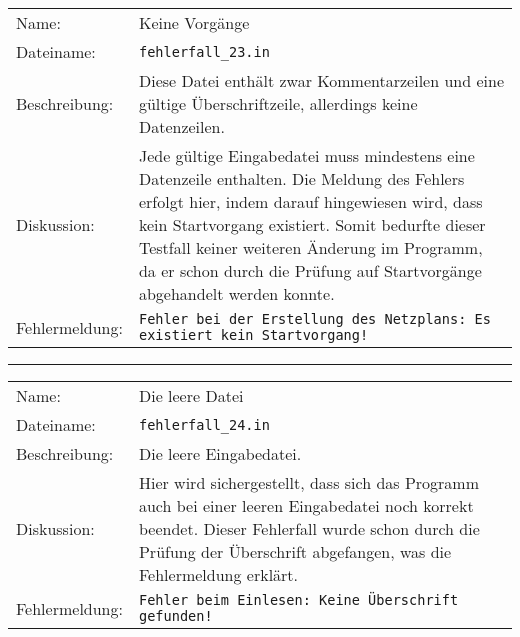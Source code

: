 \begin{tabularx}{\textwidth}{l X}
  Name: & Keine Vorg\"ange \\
  Dateiname: & \texttt{fehlerfall\_23.in} \\
  Beschreibung: & Diese Datei enth\"alt zwar Kommentarzeilen und eine
  g\"ultige \"Uberschriftzeile, allerdings keine Datenzeilen.\\
  Diskussion: & Jede g\"ultige Eingabedatei muss mindestens eine
  Datenzeile enthalten. Die Meldung des Fehlers erfolgt hier, indem
  darauf hingewiesen wird, dass kein Startvorgang existiert. Somit
  bedurfte dieser Testfall keiner weiteren \"Anderung im Programm, da
  er schon durch die Pr\"ufung auf Startvorg\"ange abgehandelt werden
  konnte.\\
  Fehlermeldung: & \texttt{Fehler bei der Erstellung des Netzplans: Es
    existiert kein Startvorgang!} \\
\end{tabularx}
\hrule
\begin{tabularx}{\textwidth}{l X}
  Name: & Die leere Datei \\
  Dateiname: & \texttt{fehlerfall\_24.in} \\
  Beschreibung: & Die leere Eingabedatei.\\
  Diskussion: & Hier wird sichergestellt, dass sich das Programm auch
  bei einer leeren Eingabedatei noch korrekt beendet. Dieser
  Fehlerfall wurde schon durch die Pr\"ufung der \"Uberschrift
  abgefangen, was die Fehlermeldung erkl\"art.\\
  Fehlermeldung: & \texttt{Fehler beim Einlesen: Keine Überschrift
    gefunden!} \\
\end{tabularx}
